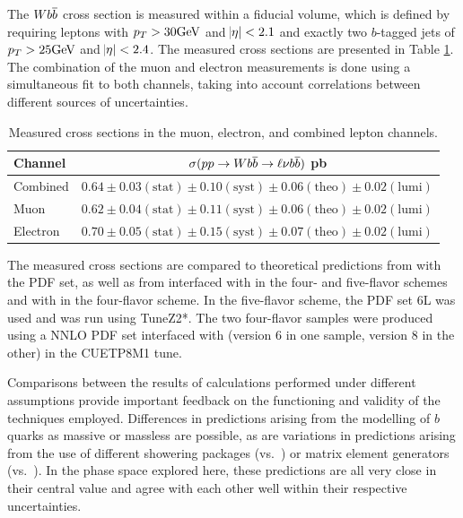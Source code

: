 The $W b\overline{b}$ cross section is measured within a fiducial volume, which is defined by
requiring leptons with $p_T > 30\mathrm{GeV}$ and $\abs{\eta}<2.1$ and exactly two $b$-tagged jets of
 $p_T > 25\mathrm{GeV}$ and $\abs{\eta}<2.4$.
The measured cross sections are presented in Table \ref{tab:crosssections}.
The combination of the muon and electron measurements is done using a simultaneous fit to both channels,
 taking into account correlations between different sources of uncertainties.

\begin{table}[!h]
\begin{center}
\caption{
 Measured cross sections in the muon, electron, and combined lepton channels.}
\label{tab:crosssections}
 \begin{tabular}{l|c}
 Channel        & $\sigma(pp\rightarrow Wb\overline{b}\rightarrow\ell\nu b\overline{b})$ pb \\
\hline
\hline
 Combined & $  0.64 \pm 0.03 \mathrm{(stat)} \pm 0.10 \mathrm{(syst)} \pm 0.06 \mathrm{(theo)} \pm 0.02 \mathrm{(lumi)} $ \\
\hline 
     Muon & $  0.62 \pm 0.04 \mathrm{(stat)} \pm 0.11 \mathrm{(syst)} \pm 0.06 \mathrm{(theo)} \pm 0.02 \mathrm{(lumi)} $ \\
 Electron & $  0.70 \pm 0.05 \mathrm{(stat)} \pm 0.15 \mathrm{(syst)} \pm 0.07 \mathrm{(theo)} \pm 0.02 \mathrm{(lumi)} $ \\
 \end{tabular}
\end{center}
\end{table}



% 
The measured cross sections are compared to theoretical predictions from
 \MCFM \cite{Campbell:2010ff, Badger:2010mg}
 with the {} PDF set, as well as from
 interfaced with \PYTHIAs in the four- and five-flavor schemes and
  with \PYTHIAe \cite{ref:Pythia8} in the four-flavor scheme.
In the five-flavor scheme, the PDF set {\CTEQ6L} was
 used and \PYTHIAs was run using {TuneZ2*}.
The two four-flavor samples were produced using
 a NNLO PDF set interfaced with %
 \PYTHIA (version 6 in one sample, version 8 in the other)
 in the {CUETP8M1} tune.

Comparisons between the results of calculations performed
 under different assumptions provide important feedback
 on the functioning and validity of the techniques employed.
Differences in predictions arising from the modelling of
 $b$ quarks as massive or massless are possible, as are
 variations in predictions arising from the use of different
 showering packages (\PYTHIAs vs.\ \PYTHIAe) or matrix element
 generators (\MADGRAPH vs.\ \MCFM).
In the phase space explored here, these predictions are all
 very close in their central value and agree with each other
 well within their respective uncertainties.

